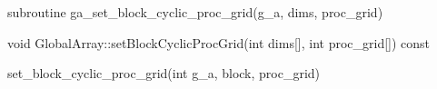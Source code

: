 \documentclass[12pt]{article}
\begin{document}
\begin{fapi}
\begin{fcode}
subroutine ga_set_block_cyclic_proc_grid(g_a, dims, proc_grid)
\end{fcode}
\begin{funcargs}
\end{funcargs}
\end{fapi}

\begin{cxxapi}
\begin{cxxcode}
void GlobalArray::setBlockCyclicProcGrid(int dims[], int proc_grid[]) const
\end{cxxcode}
\begin{funcargs}
\end{funcargs}
\end{cxxapi}

\begin{pyapi}
\begin{pycode}
set_block_cyclic_proc_grid(int g_a, block, proc_grid)
\end{pycode}
\end{pyapi}
\end{document}
